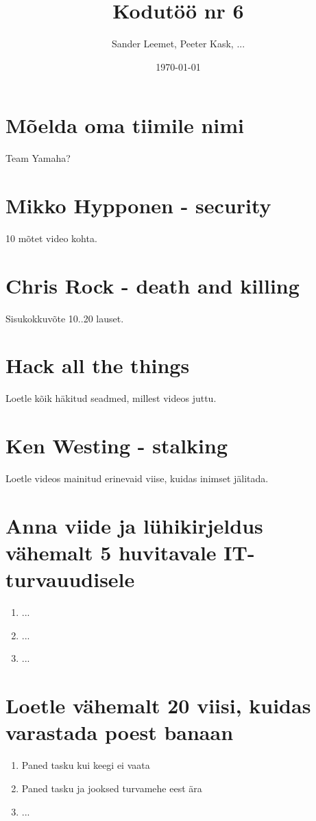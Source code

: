 \documentclass{article}
\title{Kodutöö nr 6}
\author{Sander Leemet, Peeter Kask, ...}
\date{\today}
\begin{document}
\maketitle

\section{Mõelda oma tiimile nimi}
Team Yamaha?

\section{Mikko Hypponen - security}
10 mõtet video kohta.

\section{Chris Rock - death and killing}
Sisukokkuvõte 10..20 lauset.

\section{Hack all the things}
Loetle kõik häkitud seadmed, millest videos juttu.

\section{Ken Westing - stalking}
Loetle videos mainitud erinevaid viise, kuidas inimset jälitada.

\section{Anna viide ja lühikirjeldus vähemalt 5 huvitavale IT-turvauudisele}
\begin{enumerate}
	\item{...}
	\item{...}
	\item{...}
\end{enumerate}

\section{Loetle vähemalt 20 viisi, kuidas varastada poest banaan}
\begin{enumerate}
	\item{Paned tasku kui keegi ei vaata}
	\item{Paned tasku ja jooksed turvamehe eest ära}
	\item{...}
\end{enumerate}
\end{document}
